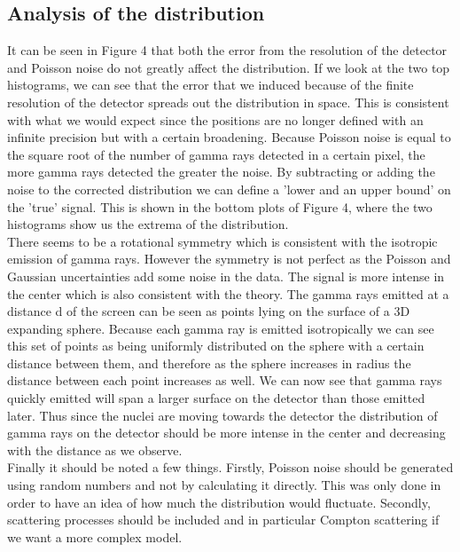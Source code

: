 \documentclass[10 pt]{article}
\numberwithin{equation}{section}
\begin{document}
\begin{multicols}{2}

\subsection{Analysis of the distribution}

It can be seen in Figure 4 that both the error from the resolution of the detector and Poisson noise do not greatly affect the distribution. If we look at the two top histograms, we can see that the error that we induced because of the finite resolution of the detector spreads out the distribution in space. This is consistent with what we would expect since the positions are no longer defined with an infinite precision but with a certain broadening. Because Poisson noise is equal to the square root of the number of gamma rays detected in a certain pixel, the more gamma rays detected the greater the noise. By subtracting or adding the noise to the corrected distribution we can define a 'lower and an upper bound' on the 'true' signal. This is shown in the bottom plots of Figure 4, where the two histograms show us the extrema of the distribution. \\There seems to be a rotational symmetry which is consistent with the isotropic emission of gamma rays. However the symmetry is not perfect as the Poisson and Gaussian uncertainties add some noise in the data. The signal is more intense in the center which is also consistent with the theory. The gamma rays emitted at a distance d of the screen can be seen as points lying on the surface of a 3D expanding sphere. Because each gamma ray is emitted isotropically we can see this set of points as being uniformly distributed on the sphere with a certain distance between them, and therefore as the sphere increases in radius the distance between each point increases as well. We can now see that gamma rays quickly emitted will span a larger surface on the detector than those emitted later. Thus since the nuclei are moving towards the detector the distribution of gamma rays on the detector should be more intense in the center and decreasing with the distance as we observe.\\
Finally it should be noted a few things. Firstly, Poisson noise should be generated using random numbers and not by calculating it directly. This was only done in order to have an idea of how much the distribution would fluctuate. Secondly, scattering processes should be included and in particular Compton scattering if we want a more complex model.


\end{multicols}
\end{document}
